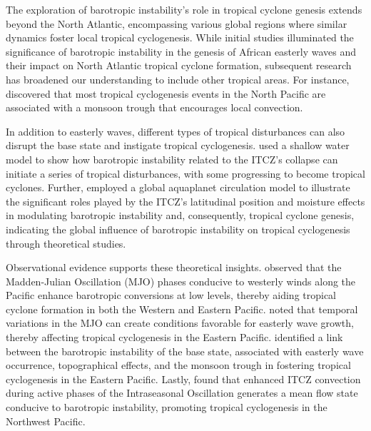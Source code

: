 The exploration of barotropic instability's role in tropical cyclone genesis extends beyond the North Atlantic, encompassing various global regions where similar dynamics foster local tropical cyclogenesis. While initial studies illuminated the significance of barotropic instability in the genesis of African easterly waves and their impact on North Atlantic tropical cyclone formation, subsequent research has broadened our understanding to include other tropical areas. For instance, \citet{zehr1992tropical} discovered that most tropical cyclogenesis events in the North Pacific are associated with a monsoon trough that encourages local convection.

In addition to easterly waves, different types of tropical disturbances can also disrupt the base state and instigate tropical cyclogenesis. \citet{ferreira1997barotropic} used a shallow water model to show how barotropic instability related to the ITCZ's collapse can initiate a series of tropical disturbances, with some progressing to become tropical cyclones. Further, \citet{bembenek2021influence} employed a global aquaplanet circulation model to illustrate the significant roles played by the ITCZ's latitudinal position and moisture effects in modulating barotropic instability and, consequently, tropical cyclone genesis, indicating the global influence of barotropic instability on tropical cyclogenesis through theoretical studies.

Observational evidence supports these theoretical insights. \citet{maloney2001madden} observed that the Madden-Julian Oscillation (MJO) phases conducive to westerly winds along the Pacific enhance barotropic conversions at low levels, thereby aiding tropical cyclone formation in both the Western and Eastern Pacific. \citet{molinari1997potential} noted that temporal variations in the MJO can create conditions favorable for easterly wave growth, thereby affecting tropical cyclogenesis in the Eastern Pacific. \citet{molinari2000origins} identified a link between the barotropic instability of the base state, associated with easterly wave occurrence, topographical effects, and the monsoon trough in fostering tropical cyclogenesis in the Eastern Pacific. Lastly, \citet{cao2012modulation} found that enhanced ITCZ convection during active phases of the Intraseasonal Oscillation generates a mean flow state conducive to barotropic instability, promoting tropical cyclogenesis in the Northwest Pacific.

